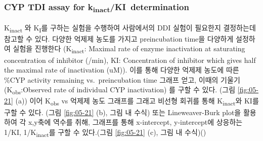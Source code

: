 \documentclass[
  11pt,
  krantz2, a4paper, twoside]{krantz}
\begin{document}
\subsubsection{\texorpdfstring{CYP TDI assay for k\textsubscript{inact}/KI~determination}{CYP TDI assay for kinact/KI~determination}}\label{cyp-tdi-assay-for-kinactki-determination}

K\textsubscript{inact} 와 K\textsubscript{I}를 구하는 실험을 수행하여 사람에서의 DDI 실험이 필요한지
결정하는데 참고할 수 있다. 다양한 억제제 농도를 가지고 preincubation
time을 다양하게 설정하여 실험을 진행한다 (K\textsubscript{inact}: Maximal rate of
enzyme inactivation at saturating concentration of inhibitor (/min), KI:
Concentration of inhibitor which gives half the maximal rate of
inactivation (uM)). 이를 통해 다양한 억제제 농도에 따른 \%CYP activity
remaining vs.~preincubation time 그래프 얻고, 이때의
기울기(K\textsubscript{obs}:Observed rate of individual CYP inactivation) 를 구할 수
있다. (그림 \ref{fig:05-21} (a)) 이어 K\textsubscript{obs} vs 억제제 농도 그래프를
그래고 비선형 회귀를 통해 K\textsubscript{inact}와 KI를 구할 수 있다. (그림
\ref{fig:05-21} (b), 그림 내 수식) 또는 Lineweaver-Burk plot을 활용하여
각 x,y축에 역수를 취해, 그래프를 통해 x-intercept, y-intercept에
상응하는 1/KI, 1/K\textsubscript{inact}를 구할 수 있다.(그림 \ref{fig:05-21} (c),
그림 내 수식)()
\end{document}
